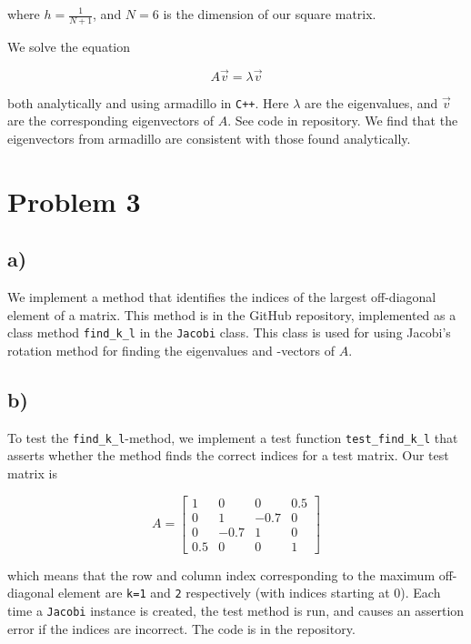 \documentclass[english,notitlepage]{article}  %
\begin{document}
where $h = \frac{1}{N+1}$, and $N = 6$ is the dimension of our square matrix.

We solve the equation

\begin{equation*}
    A \vec{v} = \lambda \vec{v}
\end{equation*}

both analytically and using armadillo in \lstinline{C++}. Here $\lambda$ are the
eigenvalues, and $\vec{v}$ are the corresponding eigenvectors of $A$. See code
in repository. We find that the eigenvectors from armadillo are consistent with
those found analytically.


\section*{Problem 3}
\subsection*{a)}
We implement a method that identifies the indices of the largest off-diagonal element of a matrix. This method is in the GitHub repository, implemented as a class method \lstinline{find_k_l} in the \lstinline{Jacobi} class. This class is used for using Jacobi's rotation method for finding the eigenvalues and -vectors of $A$.

\subsection*{b)}
To test the \lstinline{find_k_l}-method, we implement a test function \lstinline{test_find_k_l} that asserts whether the method finds the correct indices for a test matrix. Our test matrix is

\begin{equation}
  A = \begin{bmatrix}1 & 0 & 0 & 0.5 \\
  0 & 1 & -0.7 & 0 \\
  0 & -0.7 & 1 & 0 \\
  0.5 & 0 & 0 & 1 \end{bmatrix}
\end{equation}

which means that the row and column index corresponding to the maximum off-diagonal element are \lstinline{k=1} and \lstinline{2} respectively (with indices starting at 0). Each time a \lstinline{Jacobi} instance is created, the test method is run, and causes an assertion error if the indices are incorrect.
The code is in the repository.
\end{document}
